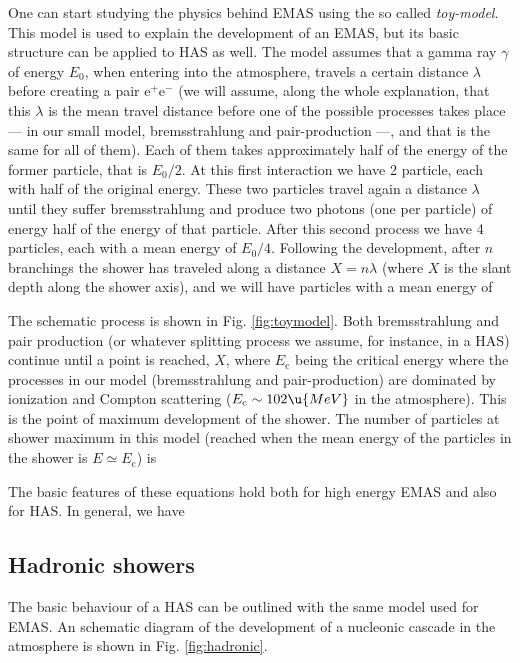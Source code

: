 One can start studying the physics behind EMAS using the so called
\emph{toy-model}. This model is used to explain the development of an
EMAS, but its basic structure can be applied to HAS as well. The model
assumes that a gamma ray $\gamma$ of energy $E_0$, when entering into
the atmosphere, travels a certain distance $\lambda$ before creating a
pair e$^+$e$^-$ (we will assume, along the whole explanation, that
this $\lambda$ is the mean travel distance before one of the possible
processes takes place --- in our small model, bremsstrahlung and
pair-production ---, and that is the same for all of them). Each of
them takes approximately half of the energy of the former particle,
that is $E_0/2$. At this first interaction we have 2 particle, each
with half of the original energy.  These two particles travel again a
distance $\lambda$ until they suffer bremsstrahlung and produce two
photons (one per particle) of energy half of the energy of that
particle.  After this second process we have 4 particles, each with a
mean energy of $E_0/4$.  Following the development, after $n$
branchings the shower has traveled along a distance $X=n\lambda$
(where $X$ is the slant depth along the shower axis), and we will have
%
\toyAeq
%
particles with a mean energy of
%
\toyBeq

The schematic process is shown in Fig.  \ref{fig:toymodel}.  Both
bremsstrahlung and pair production (or whatever splitting process we
assume, for instance, in a HAS) continue until a point is reached,
$X$, where
%
\toyCeq
%
$E_{\mathrm{c}}$ being the critical energy where the processes in our
model (bremsstrahlung and pair-production) are dominated by ionization
and Compton scattering ($E_{\mathrm{c}} \sim 102 \u{MeV}$ in the
atmosphere). This is the point of maximum development of the shower.
The number of particles at shower maximum in this model (reached when
the mean energy of the particles in the shower is $E\simeq
E_{\mathrm{c}}$) is
%
\toyDeq

\hadronicfig
%
The basic features of these equations hold both for high energy EMAS
and also for HAS. In general, we have
%
\NXsimpleeq

\subsection{Hadronic showers}

The basic behaviour of a HAS can be outlined with the same model used
for EMAS. An schematic diagram of the development of a nucleonic
cascade in the atmosphere is shown in Fig. \ref{fig:hadronic}.

